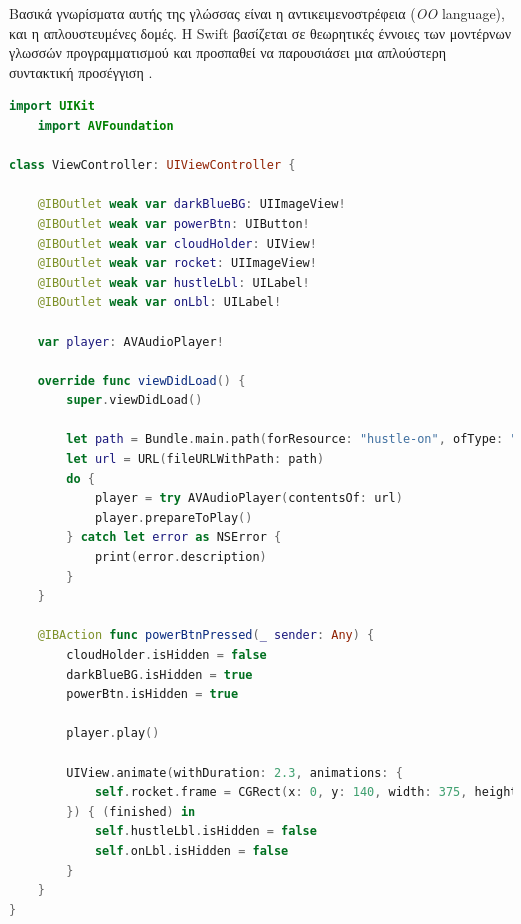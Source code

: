 Βασικά γνωρίσματα αυτής της γλώσσας είναι η αντικειμενοστρέφεια (\textit{OO} language), και η απλουστευμένες δομές. Η Swift βασίζεται σε θεωρητικές έννοιες των μοντέρνων γλωσσών προγραμματισμού και προσπαθεί να παρουσιάσει μια απλούστερη συντακτική προσέγγιση \cite{[SWIFT4], [SWIFT5]}. 

\begin{lstlisting}[language=Swift, caption=\selectlanguage{greek}Παράδειγμα κώδικα σε \selectlanguage{english}Swift]
    import UIKit
    import AVFoundation
    
class ViewController: UIViewController {
    
    @IBOutlet weak var darkBlueBG: UIImageView!
    @IBOutlet weak var powerBtn: UIButton!
    @IBOutlet weak var cloudHolder: UIView!
    @IBOutlet weak var rocket: UIImageView!
    @IBOutlet weak var hustleLbl: UILabel!
    @IBOutlet weak var onLbl: UILabel!
    
    var player: AVAudioPlayer!
    
    override func viewDidLoad() {
        super.viewDidLoad()
        
        let path = Bundle.main.path(forResource: "hustle-on", ofType: "wav")!
        let url = URL(fileURLWithPath: path)
        do {
            player = try AVAudioPlayer(contentsOf: url)
            player.prepareToPlay()
        } catch let error as NSError {
            print(error.description)
        }
    }
    
    @IBAction func powerBtnPressed(_ sender: Any) {
        cloudHolder.isHidden = false
        darkBlueBG.isHidden = true
        powerBtn.isHidden = true
        
        player.play()
        
        UIView.animate(withDuration: 2.3, animations: {
            self.rocket.frame = CGRect(x: 0, y: 140, width: 375, height: 402)
        }) { (finished) in
            self.hustleLbl.isHidden = false
            self.onLbl.isHidden = false
        }
    }
}

\end{lstlisting}


